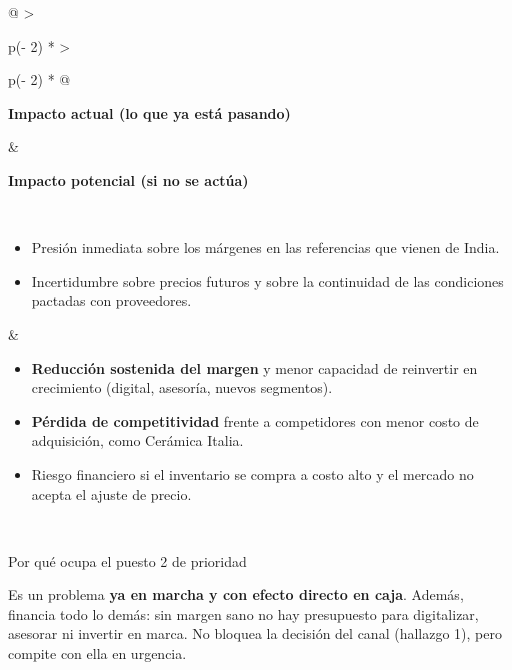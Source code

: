 \documentclass[11pt,a4paper]{article}
\begin{document}
\begin{longtable}[]{@{}
  >{\raggedright\arraybackslash}p{(\columnwidth - 2\tabcolsep) * }
  >{\raggedright\arraybackslash}p{(\columnwidth - 2\tabcolsep) * }@{}}
\toprule\noalign{}
\begin{minipage}[b]{\linewidth}\raggedright
\textbf{Impacto actual (lo que ya está pasando)}
\end{minipage} & \begin{minipage}[b]{\linewidth}\raggedright
\textbf{Impacto potencial (si no se actúa)}
\end{minipage} \\
\midrule\noalign{}
\endfirsthead
\bottomrule\noalign{}
\endlastfoot
\begin{minipage}[t]{\linewidth}\raggedright
\begin{itemize}
\item
  Presión inmediata sobre los márgenes en las referencias que vienen de India.
\item
  Incertidumbre sobre precios futuros y sobre la continuidad de las condiciones pactadas con
  proveedores.
\end{itemize}
\end{minipage} & \begin{minipage}[t]{\linewidth}\raggedright
\begin{itemize}
\item
  \textbf{Reducción sostenida del margen} y menor capacidad de reinvertir en crecimiento (digital,
  asesoría, nuevos segmentos).
\item
  \textbf{Pérdida de competitividad} frente a competidores con menor costo de adquisición, como
  Cerámica Italia.
\item
  Riesgo financiero si el inventario se compra a costo alto y el mercado no acepta el ajuste de
  precio.
\end{itemize}
\end{minipage} \\
\end{longtable}

\begin{cajaaviso}{Por qué ocupa el puesto 2 de prioridad}

Es un problema \textbf{ya en marcha y con efecto directo en caja}. Además, financia todo lo demás:
sin margen sano no hay presupuesto para digitalizar, asesorar ni invertir en marca. No bloquea la
decisión del canal (hallazgo 1), pero compite con ella en urgencia.

\end{cajaaviso}
\end{document}
